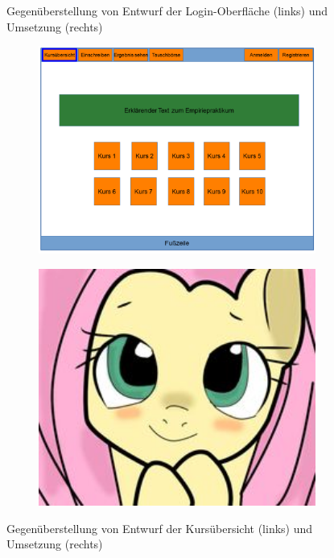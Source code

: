 \begin{figure}
\begin{subfigure}{0.49\textwidth}
            \end{subfigure}
            \caption{Gegenüberstellung von Entwurf der Login-Oberfläche (links) und Umsetzung (rechts)}
            \label{fig:comparisonLogin}
        \end{figure}
    
        \begin{figure}
            \centering
            \begin{subfigure}{0.49\textwidth}
                \includegraphics[width=1.0\textwidth]{./implementation/images/MockUpsFrontend/frontendCourses.png}
            \end{subfigure}
            \begin{subfigure}{0.49\textwidth}
                \includegraphics[width=1.0\textwidth]{./implementation/images/dummy.jpg}
            \end{subfigure}
            \caption{Gegenüberstellung von Entwurf der Kursübersicht (links) und Umsetzung (rechts)}
            \label{fig:comparisonCourses}
        \end{figure}
    

